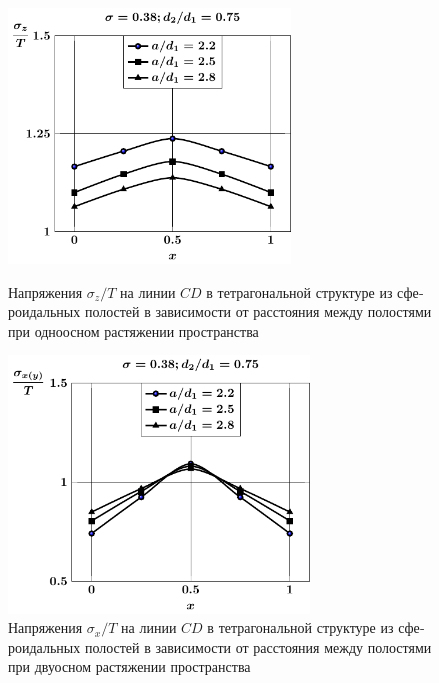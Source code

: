 \begin{russian}
%

\begin{figure}[h!]
\centering\footnotesize
\parbox[b]{7.5cm}{\centering\includegraphics[width=7.5cm]{cav8-a-d75-t1-sig_z-cd.pdf}
\caption{Напряжения $\sigma_z/T$ на линии $CD$ в тетрагональной структуре из сфероидальных полостей в зависимости от расстояния между полостями при одноосном растяжении пространства
\label{f:9:15}}}\hfil\hfil
\parbox[b]{7.5cm}{\centering\includegraphics[width=8cm]{cav8-a-d75-t2-sig_x-cd.pdf}
\caption{Напряжения $\sigma_x/T$ на линии $CD$ в тетрагональной структуре из сфероидальных полостей в зависимости от расстояния между полостями при двуосном растяжении пространства
\label{f:9:16}}}
\end{figure}


\end{russian}
